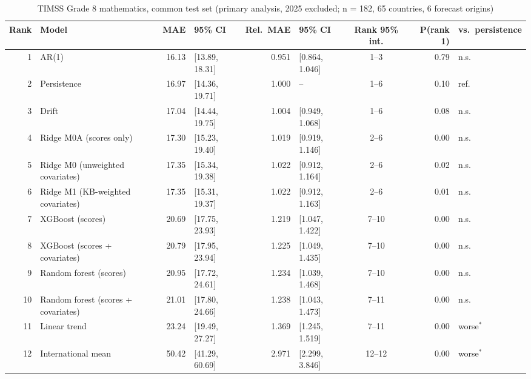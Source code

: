 \begin{table}[htbp]
\centering
\footnotesize
\caption{TIMSS Grade 8 mathematics, common test set (primary analysis, 2025 excluded; n = 182, 65 countries, 6 forecast origins)}
\label{tab:A5}
\begin{tabular}{rlrlrlcrl}
\toprule
Rank & Model & MAE & 95\% CI & Rel.\ MAE & 95\% CI & Rank 95\% int. & P(rank 1) & vs.\ persistence \\
\midrule
1 & AR(1) & 16.13 & [13.89, 18.31] & 0.951 & [0.864, 1.046] & 1--3 & 0.79 & n.s. \\
2 & Persistence & 16.97 & [14.36, 19.71] & 1.000 & -- & 1--6 & 0.10 & ref. \\
3 & Drift & 17.04 & [14.44, 19.75] & 1.004 & [0.949, 1.068] & 1--6 & 0.08 & n.s. \\
4 & Ridge M0A (scores only) & 17.30 & [15.23, 19.40] & 1.019 & [0.919, 1.146] & 2--6 & 0.00 & n.s. \\
5 & Ridge M0 (unweighted covariates) & 17.35 & [15.34, 19.38] & 1.022 & [0.912, 1.164] & 2--6 & 0.02 & n.s. \\
6 & Ridge M1 (KB-weighted covariates) & 17.35 & [15.31, 19.37] & 1.022 & [0.912, 1.163] & 2--6 & 0.01 & n.s. \\
7 & XGBoost (scores) & 20.69 & [17.75, 23.93] & 1.219 & [1.047, 1.422] & 7--10 & 0.00 & n.s. \\
8 & XGBoost (scores + covariates) & 20.79 & [17.95, 23.94] & 1.225 & [1.049, 1.435] & 7--10 & 0.00 & n.s. \\
9 & Random forest (scores) & 20.95 & [17.72, 24.61] & 1.234 & [1.039, 1.468] & 7--10 & 0.00 & n.s. \\
10 & Random forest (scores + covariates) & 21.01 & [17.80, 24.66] & 1.238 & [1.043, 1.473] & 7--11 & 0.00 & n.s. \\
11 & Linear trend & 23.24 & [19.49, 27.27] & 1.369 & [1.245, 1.519] & 7--11 & 0.00 & worse$^{*}$ \\
12 & International mean & 50.42 & [41.29, 60.69] & 2.971 & [2.299, 3.846] & 12--12 & 0.00 & worse$^{*}$ \\
\bottomrule
\end{tabular}
\par{}
\end{table}
